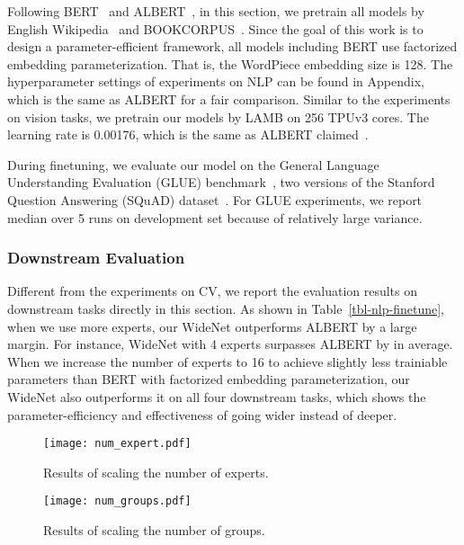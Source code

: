 \documentclass[letterpaper]{article} \usepackage{aaai22}  \usepackage{times}  \usepackage{helvet}  \usepackage{courier}  \usepackage[hyphens]{url}  \usepackage{graphicx} \urlstyle{rm} \def\UrlFont{\rm}  \usepackage{natbib}  \usepackage{caption} \DeclareCaptionStyle{ruled}{labelfont=normalfont,labelsep=colon,strut=off} \frenchspacing  \setlength{\pdfpagewidth}{8.5in}  \setlength{\pdfpageheight}{11in}  \usepackage{algorithm}
\begin{document}
Following BERT~\citep{devlin-etal-2019-bert} and ALBERT~\citep{lan2019albert}, in this section, we pretrain all models by English Wikipedia~\citep{devlin-etal-2019-bert} and BOOKCORPUS~\citep{zhu2015aligning}. Since the goal of this work is to design a parameter-efficient framework, all models including BERT use factorized embedding parameterization. That is, the WordPiece embedding size  is 128. The hyperparameter settings of experiments on NLP can be found in Appendix, which is the same as ALBERT for a fair comparison. Similar to the experiments on vision tasks, we pretrain our models by LAMB on 256 TPUv3 cores. The learning rate is 0.00176, which is the same as ALBERT claimed~\citep{you2019reducing}.

During finetuning, we evaluate our model on the General Language Understanding Evaluation (GLUE) benchmark~\citep{wang-etal-2018-glue}, two versions of the Stanford Question Answering (SQuAD) dataset~\citep{rajpurkar-etal-2016-squad,rajpurkar-etal-2018-know}. For GLUE experiments, we report median over 5 runs on development set because of relatively large variance.

\subsubsection{Downstream Evaluation}
\label{sec:nlp-downsteam}







Different from the experiments on CV, we report the evaluation results on downstream tasks directly in this section. As shown in Table~\ref{tbl-nlp-finetune}, when we use more experts, our WideNet outperforms ALBERT by a large margin. For instance, WideNet with 4 experts surpasses ALBERT by  in average. When we increase the number of experts  to 16 to achieve slightly less trainiable parameters than BERT with factorized embedding  parameterization, our WideNet also outperforms it on all four downstream tasks, which shows the parameter-efficiency and effectiveness of going wider instead of deeper.







\begin{figure*}
\centering
\begin{minipage}[b]{.45\textwidth}
\texttt{[image: num\_expert.pdf]}
\caption{Results of scaling the number of experts.}\label{fig:num_expert}
\end{minipage}\hfill
\begin{minipage}[b]{.45\textwidth}
\texttt{[image: num\_groups.pdf]}
\caption{Results of scaling the number of groups.}\label{fig:num_group}
\end{minipage}
\end{figure*}
\end{document}
